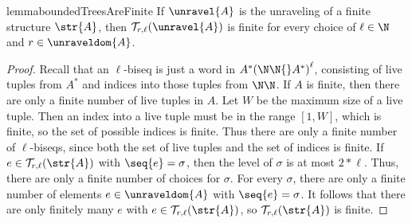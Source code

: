 \ifmainpart
\begin{restatable}{lemma}{boundedTreesAreFinite}\label{lem:bounded-trees-are-finite}
  If $\unravel{A}$ is the unraveling of a finite structure $\str{A}$, then $\mathcal{T}_{r,\ell}(\unravel{A})$ is finite for every choice of $\ell \in \N$ and $r \in \unraveldom{A}$.
\end{restatable}
\fi
\ifmainpart
\begin{proof}
Recall that an $\ell$-biseq is just a word in $A^*{(\N\N{}A^{*})}^{\ell}$, consisting of live tuples from $A^{*}$ and indices into those tuples from $\N\N$.
If $A$ is finite, then there are only a finite number of live tuples in $A$.
Let $W$ be the maximum size of a live tuple.
Then an index into a live tuple must be in the range $[1,W]$, which is finite, so the set of possible indices is finite.
Thus there are only a finite number of $\ell$-biseqs, since both the set of live tuples and the set of indices is finite.
If $e \in \mathcal{T}_{r,\ell}(\str{A})$ with $\seq{e} = \sigma$, then the level of $\sigma$ is at most $2 * \ell$.
Thus, there are only a finite number of choices for $\sigma$.
For every $\sigma$, there are only a finite number of elements $e \in \unraveldom{A}$ with $\seq{e} = \sigma$.
It follows that there are only finitely many $e$ with $e \in \mathcal{T}_{r,\ell}(\str{A})$, so $\mathcal{T}_{r,\ell}(\str{A})$ is finite.
\end{proof}
\fi
